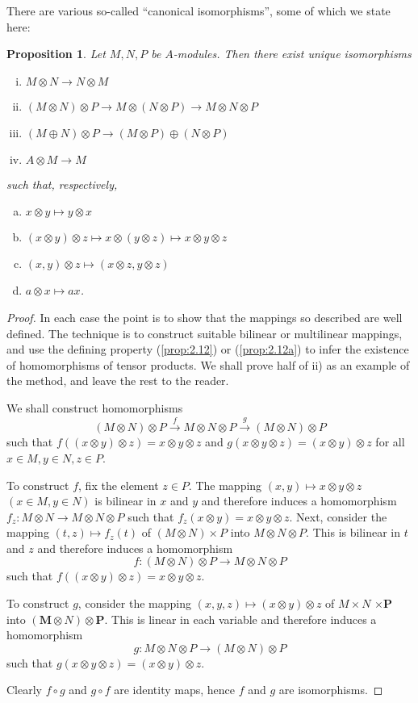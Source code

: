 \documentclass{standalone}
\newtheorem{proposition}[theorem]{Proposition}
\theoremstyle{definition}
\theoremstyle{remark}
\begin{document}
There are various so-called ``canonical isomorphisms'', some of which we state
here:
\begin{proposition}
  \label{prop:2.14}
  Let $M, N, P$ be $A$-modules. Then there exist unique isomorphisms
  \begin{enumerate}[i)]
  \item $M \otimes N \to N \otimes M$
  \item $(M \otimes N) \otimes P \to M \otimes(N \otimes P) \to M \otimes N \otimes P$
  \item $(M \oplus N) \otimes P \to(M \otimes P) \oplus(N \otimes P)$
  \item $A \otimes M \to M$
  \end{enumerate}
  such that, respectively,
  \begin{enumerate}[a)]
  \item $x \otimes y \mapsto y \otimes x$
  \item $(x \otimes y) \otimes z \mapsto x \otimes(y \otimes z) \mapsto x \otimes y \otimes z$
  \item $(x, y) \otimes z \mapsto(x \otimes z, y \otimes z)$
  \item $a \otimes x \mapsto a x$.
  \end{enumerate}
\end{proposition}
\begin{proof}
  In each case the point is to show that the mappings so described are well
defined. The technique is to construct suitable bilinear or multilinear
mappings, and use the defining property (\ref{prop:2.12}) or (\ref{prop:2.12a}) to
infer the existence of homomorphisms of tensor products. We shall prove half of
ii) as an example of the method, and leave the rest to the reader.

We shall construct homomorphisms
\[
  (M \otimes N) \otimes P \stackrel{f}{\to} M \otimes N \otimes P \stackrel{g}{\to}(M \otimes N) \otimes P
\]
such that $f((x \otimes y) \otimes z)=x \otimes y \otimes z$ and
$g(x \otimes y \otimes z)=(x \otimes y) \otimes z$ for all
$x \in M, y \in N, z \in P$.

To construct $f$, fix the element $z \in P$. The mapping
$(x, y) \mapsto x \otimes y \otimes z$ $(x \in M, y \in N)$ is bilinear in $x$
and $y$ and therefore induces a homomorphism
$f_{z}\colon M \otimes N \to M \otimes N \otimes P$ such that
$f_{z}(x \otimes y)=x \otimes y \otimes z$. Next, consider the mapping
$(t, z) \mapsto f_{z}(t)$ of $(M \otimes N) \times P$ into
$M \otimes N \otimes P$. This is bilinear in $t$ and $z$ and therefore induces a
homomorphism
\[
  f\colon(M \otimes N) \otimes P \to M \otimes N \otimes P
\]
such that $f((x \otimes y) \otimes z)=x \otimes y \otimes z$.

To construct $g$, consider the mapping
$(x, y, z) \mapsto(x \otimes y) \otimes z$ of $M \times N$
$\times \boldsymbol{P}$ into
$(\boldsymbol{M} \otimes N) \otimes \boldsymbol{P}$. This is linear in each
variable and therefore induces a homomorphism
\[
  g\colon M \otimes N \otimes P \to(M \otimes N) \otimes P
\]
such that $g(x \otimes y \otimes z)=(x \otimes y) \otimes z$.

Clearly $f \circ g$ and $g \circ f$ are identity maps, hence $f$ and $g$ are
isomorphisms.
\end{proof}
\end{document}
